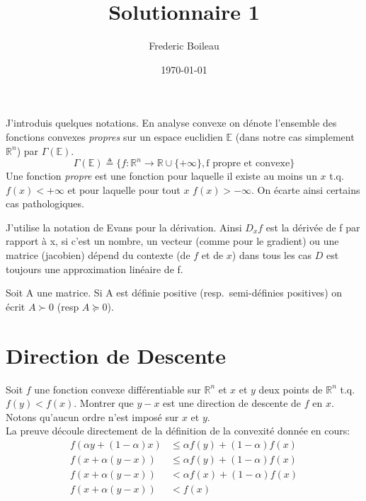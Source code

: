 

\renewcommand{\familydefault}{\sfdefault}
\usepackage{titling}
\usepackage[backend=biber,citestyle=authoryear,style=ieee]{biblatex}
\usepackage{amsmath}
\usepackage{fancyhdr}
\pagestyle{fancy}

\title{Solutionnaire 1}
\author{Frederic Boileau}
\date{\today}




\fancyhf{}
\maketitle
\thispagestyle{fancy}

J'introduis quelques notations. En analyse convexe on dénote l'ensemble
des fonctions convexes \emph{propres} sur un espace euclidien $\mathbb E$
(dans notre cas simplement $\mathbb R^n$) par $\Gamma (\mathbb E)$.
\begin{equation*}
    \Gamma (\mathbb E) \triangleq \{f : \mathbb R^n \rightarrow \mathbb R
    \cup \{+\infty\}, \text{f propre et convexe}\}
\end{equation*}
Une fonction \emph{propre} est une fonction pour laquelle il existe au moins un
$x$ t.q. $f(x) < + \infty $ et pour laquelle pour tout $x$ $f(x) > -\infty$. 
On écarte ainsi certains cas pathologiques.

J'utilise la notation de Evans pour la d\'erivation. Ainsi $D_x f$ 
est la d\'eriv\'ee de f par rapport \`a x, si c'est un nombre, un vecteur
(comme pour le gradient) ou une matrice (jacobien) d\'epend du contexte
(de $f$ et de $x$) dans tous les cas $D$ est toujours une approximation
linéaire de f. 

Soit A une matrice. Si A est d\'efinie positive  (resp.\  semi-d\'efinies
positives) on \'ecrit $A \succ 0$ (resp $A \succeq 0$).

\section{Direction de Descente}

Soit $f$ une fonction convexe différentiable sur $\mathbb R^n$ 
et $x$ et $y$ deux points de $\mathbb R^n$ t.q. $f(y) < f(x)$.
Montrer que $y-x$ est une direction de descente de $f$ en $x$.
Notons qu'aucun ordre n'est impos\'e  sur $x$ et $y$.\\

La preuve d\'ecoule directement de la d\'efinition de la 
convexit\'e donn\'ee en cours:
\begin{align*}
    f(\alpha y + (1-\alpha)x) &\leq \alpha f(y) + (1-\alpha)f(x)\\
    f(x + \alpha(y-x)) &\leq \alpha f(y) + (1-\alpha)f(x)\\
    f(x + \alpha(y-x)) &< \alpha f(x) + (1-\alpha)f(x)\\
    f(x + \alpha(y-x)) &< f(x)
\end{align*}

